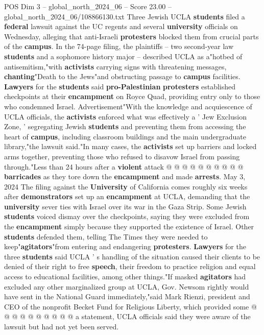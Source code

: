 \begin{textsample}{POS Dim 3 – global\_north\_2024\_06 – Score 23.00 – global\_north\_2024\_06/108866130.txt}  \label{ex:f3_pos_065}
Three Jewish UCLA \textbf{students} filed a \textbf{federal} lawsuit against the UC regents and several \textbf{university} officials on Wednesday, alleging that anti-Israeli \textbf{protesters} blocked them from crucial parts of the \textbf{campus}.
In the 74-page filing, the plaintiffs -- two second-year law \textbf{students} and a sophomore history major -- described UCLA as a"hotbed of antisemitism,"with \textbf{activists} carrying signs with threatening messages, \textbf{chanting}"Death to the Jews"and obstructing passage to \textbf{campus} facilities. \textbf{Lawyers} for the \textbf{students} said \textbf{pro-Palestinian} \textbf{protesters} established checkpoints at their \textbf{encampment} on Royce Quad, providing entry only to those who condemned Israel.
Advertisement"With the knowledge and acquiescence of UCLA officials, the \textbf{activists} enforced what was effectively a ' Jew Exclusion Zone, ' segregating Jewish \textbf{students} and preventing them from accessing the heart of \textbf{campus}, including classroom buildings and the main undergraduate library,"the lawsuit said."In many cases, the \textbf{activists} set up barriers and locked arms together, preventing those who refused to disavow Israel from passing through."Less than 24 hours after a \textbf{violent} attack @ @ @ @ @ @ @ @ @ @ \textbf{barricades} as they tore down the \textbf{encampment} and made \textbf{arrests}.
May 3, 2024 The filing against the \textbf{University} of California comes roughly six weeks after \textbf{demonstrators} set up an \textbf{encampment} at UCLA, demanding that the \textbf{university} sever ties with Israel over its war in the Gaza Strip.
Some Jewish \textbf{students} voiced dismay over the checkpoints, saying they were excluded from the \textbf{encampment} simply because they supported the existence of Israel.
Other \textbf{students} defended them, telling The Times they were needed to keep"\textbf{agitators}"from entering and endangering \textbf{protesters}. \textbf{Lawyers} for the three \textbf{students} said UCLA ' s handling of the situation caused their clients to be denied of their right to free \textbf{speech}, their freedom to practice religion and equal access to educational facilities, among other things."If masked \textbf{agitators} had excluded any other marginalized group at UCLA, Gov.
Newsom rightly would have sent in the National Guard immediately,"said Mark Rienzi, president and CEO of the nonprofit Becket Fund for Religious Liberty, which provided some @ @ @ @ @ @ @ @ @ @ a statement, UCLA officials said they were aware of the lawsuit but had not yet been served.

\end{textsample}
